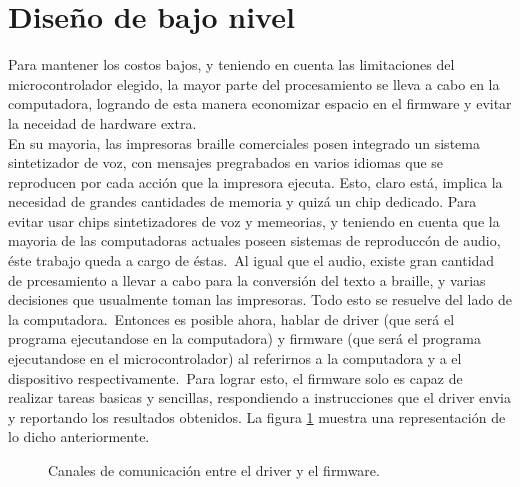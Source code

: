 \section{Dise\~no de bajo nivel}
%
Para mantener los costos bajos, y teniendo en cuenta las limitaciones del
microcontrolador elegido, la mayor parte del procesamiento se lleva a cabo
en la computadora, logrando de esta manera economizar espacio en el firmware y
evitar la neceidad de hardware extra.\\

En su mayoria, las impresoras braille comerciales posen integrado un sistema
sintetizador de voz, con mensajes pregrabados en varios idiomas que se
reproducen por cada acci\'on que la impresora ejecuta. Esto, claro est\'a,
implica la necesidad de grandes cantidades de memoria y quiz\'a un chip
dedicado. Para evitar usar chips sintetizadores de voz y memeorias, y
teniendo en cuenta que la mayoria de las computadoras actuales poseen sistemas
de reproducc\'on de audio, \'este trabajo queda a cargo de \'estas.\
Al igual que el audio, existe gran cantidad de prcesamiento a llevar a cabo
para la conversi\'on del texto a braille, y varias decisiones que usualmente
toman las impresoras. Todo esto se resuelve del lado de la computadora.\
Entonces es posible ahora, hablar de driver (que ser\'a el programa
ejecutandose en la computadora) y firmware (que ser\'a el programa ejecutandose
en el microcontrolador) al referirnos a la computadora y a el dispositivo
respectivamente.\
Para lograr esto, el firmware solo es capaz de realizar tareas basicas y
sencillas, respondiendo a instrucciones que el driver envia y reportando los
resultados obtenidos. La figura \ref{fig:driver_firmware} muestra una
representaci\'on de lo dicho anteriormente.\\

\begin{figure}[htp]
\centering
{}
\caption{Canales de comunicaci\'on entre el driver y el firmware.}
\label{fig:driver_firmware}
\end{figure}



